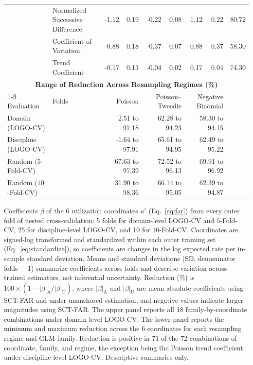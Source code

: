 \documentclass{article}
\begin{document}
\begin{table}[H]
\begin{tabularx}{\linewidth}{@{}l>{\raggedright\arraybackslash}Xrrrrrrr@{}}
 & Normalized Successive Difference & -1.12 & 0.19 & -0.22 & 0.08 & 1.12 & 0.22 & 80.72 \\
 & Coefficient of Variation & -0.88 & 0.18 & -0.37 & 0.07 & 0.88 & 0.37 & 58.30 \\
 & Trend Coefficient & -0.17 & 0.13 & -0.04 & 0.02 & 0.17 & 0.04 & 74.30 \\
\midrule
\multicolumn{9}{c}{\textbf{Range of Reduction Across Resampling Regimes (\%)}} \\
\cmidrule(lr){1-9}
Evaluation & Folds & \multicolumn{2}{r}{Poisson} & \multicolumn{2}{r}{Poisson--Tweedie} & \multicolumn{2}{r}{Negative Binomial} & \\
\midrule
Domain (LOGO-CV) & 5 & \multicolumn{2}{r}{2.51 to 97.18} & \multicolumn{2}{r}{62.28 to 94.23} & \multicolumn{2}{r}{58.30 to 94.15} & \\
Discipline (LOGO-CV) & 25 & \multicolumn{2}{r}{-1.64 to 97.91} & \multicolumn{2}{r}{65.61 to 94.95} & \multicolumn{2}{r}{62.49 to 95.22} & \\
Random ($5$-Fold-CV) & 5 & \multicolumn{2}{r}{67.63 to 97.39} & \multicolumn{2}{r}{72.52 to 96.13} & \multicolumn{2}{r}{69.91 to 96.92} & \\
Random ($10$-Fold-CV) & 10 & \multicolumn{2}{r}{31.90 to 98.36} & \multicolumn{2}{r}{66.14 to 95.05} & \multicolumn{2}{r}{62.39 to 94.87} & \\
\bottomrule
\end{tabularx}
\par\vspace{12pt}
\begin{minipage}{\linewidth}
\footnotesize
Coefficients $\beta$ of the 6 utilization coordinates $u'$ (Eq.~\eqref{eq:far}) from every outer fold of nested cross-validation: 5 folds for domain-level LOGO-CV and $5$-Fold-CV, 25 for discipline-level LOGO-CV, and 10 for $10$-Fold-CV. Coordinates are signed-log transformed and standardized within each outer training set (Eq.~\eqref{eq:standardize}), so coefficients are changes in the log expected rate per in-sample standard deviation. Means and standard deviations (SD, denominator folds $-$ 1) summarize coefficients across folds and describe variation across trained estimators, not inferential uncertainty. Reduction (\%) is $100 \times (1 - \overline{\lvert \beta \rvert}_{\mathrm{A}} / \overline{\lvert \beta \rvert}_{\mathrm{U}})$, where $\overline{\lvert \beta \rvert}_{\mathrm{A}}$ and $\overline{\lvert \beta \rvert}_{\mathrm{U}}$ are mean absolute coefficients using SCT-FAR and under unanchored estimation, and negative values indicate larger magnitudes using SCT-FAR. The upper panel reports all 18 family-by-coordinate combinations under domain-level LOGO-CV. The lower panel reports the minimum and maximum reduction across the 6 coordinates for each resampling regime and GLM family. Reduction is positive in 71 of the 72 combinations of coordinate, family, and regime, the exception being the Poisson trend coefficient under discipline-level LOGO-CV. Descriptive summaries only.
\end{minipage}
\end{table}
\end{document}
